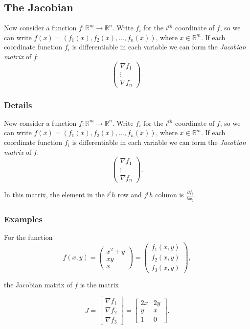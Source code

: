 \documentclass[12pt,a4paper]{article}
\theoremstyle{regla}
\theoremstyle{remark}
\theoremstyle{definition}
\theoremstyle{nonumberbreak}
\begin{document}
\subsection{The Jacobian}
\begin{fbox}
\begin{minipage}{0.97\textwidth}
Now consider a function 
$f:\mathbb{R}^m\to\mathbb{R}^n$. 
Write $f_i$ for the $i^{th}$ coordinate of $f$, so we can write $f(x)=(f_1(x),f_2(x),\ldots,f_n(x))$, 
where $x\in\mathbb{R}^m$. 
If each coordinate function $f_i$ is differentiable in each variable we can form the {\em Jacobian matrix} of $f$: 
$$\begin{pmatrix}\nabla f_1\\ \vdots \\ \nabla f_n\end{pmatrix}.$$

\end{minipage}
\end{fbox}
\subsubsection{Details}
Now consider a function 
$f:\mathbb{R}^m\to\mathbb{R}^n$. 
Write $f_i$ for the $i^{th}$ coordinate of $f$, so we can write $f(x)=(f_1(x),f_2(x),\ldots,f_n(x))$, 
where $x\in\mathbb{R}^m$. 
If each coordinate function $f_i$ is differentiable in each variable we can form the {\em Jacobian matrix} of $f$: 
$$\begin{pmatrix}\nabla f_1\\ \vdots \\ \nabla f_n\end{pmatrix}.$$


In this matrix, the element in the $i^th$ row and $j^th$ column is $\frac{\partial f_i}{\partial x_j}$.
\subsubsection{Examples}
\begin{xmpl}

For the function $$f(x,y)=\begin{pmatrix}
  x^2 +y \\
  x y  \\
  x 
\end{pmatrix}
=
\begin{pmatrix}
  f_1(x,y) \\
  f_2(x,y) \\
  f_3(x,y) 
\end{pmatrix},$$

the Jacobian matrix of $f$ is the matrix

$$J= \begin{bmatrix}
      \nabla f_1 \\
      \nabla f_2 \\
      \nabla f_3 
      \end{bmatrix}
=
\begin{bmatrix}
      2x & 2y \\
      y & x \\
      1 & 0 
      \end{bmatrix}.
$$
\end{xmpl}
\end{document}
